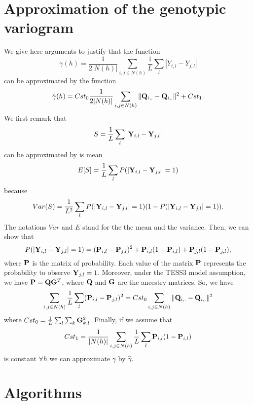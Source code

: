 \section{Approximation of the genotypic variogram}\label{app:approx}

We give here arguments to justify that the function
$$
\gamma(h) = \frac{1}{2 |N(h)|} \sum_{i,j \in N(h)} \frac{1}{L} \sum_{l} |Y_{i,l} - Y_{j,l}|
$$
can be approximated by the function 
$$\hat{\gamma}(h) = {Cst}_0 \frac{1}{2 |N(h)|} \sum_{i,j \in N(h)} \| {\bf Q}_{i,.} - {\bf Q}_{i,.}\|^2 + {Cst}_1. 
$$
We first remark that
$$
S = \frac{1}{L} \sum_l |{\bf Y}_{i,l} - {\bf Y}_{j,l}|
$$
can be approximated by is mean 
$$
E[S] = \frac{1}{L} \sum_l P(|{\bf Y}_{i,l} - {\bf Y}_{j,l}| = 1)
$$
because 
$$
Var(S) = \frac{1}{L^2} \sum_l P(|{\bf Y}_{i,l} - {\bf Y}_{j,l}| = 1) 
( 1 - P(|{\bf Y}_{i,l} - {\bf Y}_{j,l}| = 1)).
$$
The notations $Var$ and $E$ stand for the the mean and the variance. Then, we can show that 
$$
P(|{\bf Y}_{i,l} - {\bf Y}_{j,l}| = 1) = ({\bf P}_{i,l} - {\bf P}_{j,l})^2 + {\bf P}_{i,l} (1 - {\bf P}_{i,l}) + {\bf P}_{j,l} (1 - {\bf P}_{j,l}),
$$
\noindent where ${\bf P}$ is the matrix of probability. Each value of the matrix ${\bf P}$ represents the probability to observe ${\bf Y}_{j,l} = 1$. Moreover, under the TESS3 model assumption, we have ${\bf P} = {\bf Q} {\bf G}^T$, where ${\bf Q}$ and ${\bf G}$ are the ancestry matrices. So, we have
$$
\sum_{i,j \in N(h)} \frac{1}{L} \sum_{l} ({\bf P}_{i,l} - {\bf P}_{j,l})^2 = {Cst}_0 \sum_{i,j \in N(h)} \| {\bf Q}_{i,.} - {\bf Q}_{i,.}\|^2
$$
where ${Cst}_0 = \frac{1}{L} \sum_{l} \sum_{k} {\bf G}_{k,l}^2$.
Finally, if we assume that 
$$
{Cst}_1 = \frac{1}{|N(h)|} \sum_{i,j \in N(h)} \frac{1}{L} \sum_l  {\bf P}_{i,l} (1 - {\bf P}_{i,l})
$$
is constant $\forall h$ we can approximate $\gamma$ by $\hat{\gamma}$. 




\section{Algorithms}\label{app:algo}

